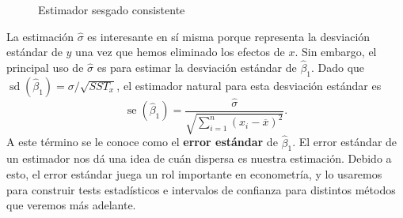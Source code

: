 \documentclass{report}\usepackage[]{graphicx}\usepackage[]{color}
\newcommand*{\kw}[1]{\textbf{#1}\index{#1}}
\newcommand{\sd}{\operatorname{sd}}
\newcommand{\se}{\operatorname{se}}
\begin{document}
\begin{figure}[htb]
  \centering
  \caption{Estimador sesgado consistente}
  \label{fig:estimador_sesgado_consistente}
\end{figure}%

La estimación $\hat\sigma$ es interesante en sí misma porque representa la desviación estándar de $y$ una vez que hemos eliminado los efectos de $x$.
Sin embargo, el principal uso de $\hat\sigma$ es para estimar la desviación estándar de $\hat\beta_1$.
Dado que $\sd(\hat\beta_1) = \sigma / \sqrt{SST_x}$, el estimador natural para esta desviación estándar es
\begin{equation}
\se(\hat\beta_1) = \frac{\hat\sigma}{\sqrt{\sum_{i=1}^n(x_i - \overline x)^2}}.
\end{equation}
A este término se le conoce como el \kw{error estándar} de $\hat\beta_1$.
El error estándar de un estimador nos dá una idea de cuán dispersa es nuestra estimación. Debido a esto, el error estándar juega un rol importante en econometría, y lo usaremos para construir tests estadísticos e intervalos de confianza para distintos métodos que veremos más adelante.

 
\nocite{*}
\printbibliography
\printindex
\end{document}
